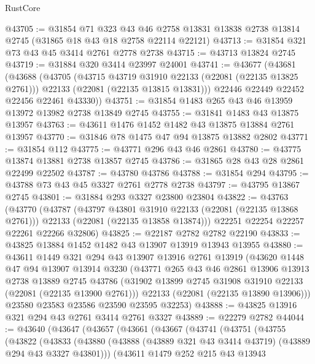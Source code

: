 \begin{lexlean}{RustCore}
\begin{coremodule}
@43705 := @31854
    @71
    @323
    @43
    @46
    @2758
    @13831
    @13838
    @2738
    @13814
    @2745
    (@31865 @18 @43 @18 @2758 @22114 @22121)
@43713 := @31854 @321 @73 @43 @45 @3414 @2761 @2778 @2738
@43715 := @43713 @13824 @2745
@43719 := @31884 @320 @3414 @23997 @24001
@43741 := @43677
    (@43681
      (@43688
        (@43705
          (@43715 @43719 @31910 @22133 (@22081 (@22135 @13825 @2761)))
          @22133
          (@22081 (@22135 @13815 @13831)))
        @22446
        @22449
        @22452
        @22456
        @22461
        @43330))
@43751 := @31854 @1483 @265 @43 @46 @13959 @13972 @13982 @2738 @13849 @2745
@43755 := @31841 @1483 @43 @13875 @13957
@43763 := @43611 @1476 @1452 @1482 @43 @13875 @13884 @2761 @13957
@43770 := @31846 @78 @1475 @47 @94 @13875 @13882 @2802
@43771 := @31854 @112
@43775 := @43771 @296 @43 @46 @2861
@43780 := @43775 @13874 @13881 @2738 @13857 @2745
@43786 := @31865 @28 @43 @28 @2861 @22499 @22502
@43787 := @43780 @43786
@43788 := @31854 @294
@43795 := @43788 @73 @43 @45 @3327 @2761 @2778 @2738
@43797 := @43795 @13867 @2745
@43801 := @31884 @293 @3327 @23800 @23804
@43822 := @43763
    (@43770
      (@43787
        (@43797 @43801 @31910 @22133 (@22081 (@22135 @13868 @2761)))
        @22133
        (@22081 (@22135 @13858 @13874)))
      @22251
      @22254
      @22257
      @22261
      @22266
      @32806)
@43825 := @22187 @2782 @2782 @22190
@43833 := @43825 @13884 @1452 @1482 @43 @13907 @13919 @13943 @13955
@43880 := @43611
    @1449
    @321
    @294
    @43
    @13907
    @13916
    @2761
    @13919
    (@43620
      @1448
      @47
      @94
      @13907
      @13914
      @3230
      (@43771
        @265
        @43
        @46
        @2861
        @13906
        @13913
        @2738
        @13889
        @2745
        @43786
        (@31902 @13899 @2745 @31908 @31910 @22133 (@22081 (@22135 @13900 @2761)))
        @22133
        (@22081 (@22135 @13890 @13906)))
      @23580
      @23583
      @23586
      @23590
      @23595
      @32253)
@43888 := @43825 @13916 @321 @294 @43 @2761 @3414 @2761 @3327
@43889 := @22279 @2782
@44044 := @43640
    (@43647
      (@43657
        (@43661
          (@43667
            (@43741
              (@43751
                (@43755
                  (@43822
                    (@43833
                      (@43880
                        (@43888 (@43889 @321 @43 @3414 @43719) (@43889 @294 @43 @3327 @43801)))
                      (@43611
                        @1479
                        @252
                        @215
                        @43
                        @13943

\end{coremodule}
\end{lexlean}
